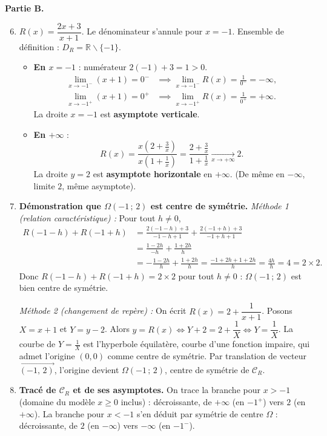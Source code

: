 \documentclass[11pt]{article}
\newcommand{\cle}[1]{{\popxbold\color{popdark}#1}}
\def\setminus{\mathbin{\backslash}}\let\smallsetminus\setminus
\begin{document}
\begin{exoresolu}
\textbf{Partie B.}
\begin{enumerate}
\setcounter{enumi}{5}
\item $R(x) = \dfrac{2x+3}{x+1}$. Le dénominateur s'annule pour $x = -1$.
      Ensemble de définition : $D_R = \mathbb{R} \setminus \{-1\}$.
      \begin{itemize}
      \item \textbf{En $x = -1$} : numérateur $2(-1)+3 = 1 > 0$.
            \begin{align*}
            \lim_{x \to -1^-} (x+1) = 0^- &\implies \lim_{x \to -1^-} R(x) = \frac{1}{0^-} = -\infty, \\
            \lim_{x \to -1^+} (x+1) = 0^+ &\implies \lim_{x \to -1^+} R(x) = \frac{1}{0^+} = +\infty.
            \end{align*}
            La droite $x = -1$ est \textbf{asymptote verticale}.
      \item \textbf{En $+\infty$} :
            \[
            R(x) = \frac{x(2 + \frac{3}{x})}{x(1 + \frac{1}{x})} = \frac{2 + \frac{3}{x}}{1 + \frac{1}{x}} \xrightarrow[x \to +\infty]{} 2.
            \]
            La droite $y = 2$ est \textbf{asymptote horizontale} en $+\infty$.
            (De même en $-\infty$, limite $2$, même asymptote).
      \end{itemize}
\item \textbf{Démonstration que $\Omega(-1\,;\,2)$ est centre de symétrie.}
      \textit{Méthode 1 (relation caractéristique) :} Pour tout $h \neq 0$,
      \begin{align*}
      R(-1-h) + R(-1+h)
      &= \frac{2(-1-h)+3}{-1-h+1} + \frac{2(-1+h)+3}{-1+h+1} \\
      &= \frac{1 - 2h}{-h} + \frac{1 + 2h}{h} \\
      &= -\frac{1-2h}{h} + \frac{1+2h}{h} = \frac{-1+2h+1+2h}{h} = \frac{4h}{h} = 4 = 2 \times 2.
      \end{align*}
      Donc $R(-1-h) + R(-1+h) = 2 \times 2$ pour tout $h \neq 0$ : $\Omega(-1\,;\,2)$ est bien centre de symétrie.
      
      \textit{Méthode 2 (changement de repère) :} On écrit $R(x) = 2 + \dfrac{1}{x+1}$.
      Posons $X = x + 1$ et $Y = y - 2$. Alors $y = R(x) \iff Y + 2 = 2 + \dfrac{1}{X} \iff Y = \dfrac{1}{X}$.
      La courbe de $Y = \frac{1}{X}$ est l'hyperbole équilatère, courbe d'une fonction \cle{impaire}, qui admet l'origine $(0,0)$ comme centre de symétrie.
      Par translation de vecteur $\overrightarrow{(-1,\,2)}$, l'origine devient $\Omega(-1\,;\,2)$, centre de symétrie de $\mathcal{C}_R$.
\item \textbf{Tracé de $\mathcal{C}_R$ et de ses asymptotes.}
      On trace la branche pour $x > -1$ (domaine du modèle $x \ge 0$ inclus) : décroissante, de $+\infty$ (en $-1^+$) vers $2$ (en $+\infty$).
      La branche pour $x < -1$ s'en déduit par symétrie de centre $\Omega$ : décroissante, de $2$ (en $-\infty$) vers $-\infty$ (en $-1^-$).
\end{enumerate}


\end{exoresolu}
\end{document}
